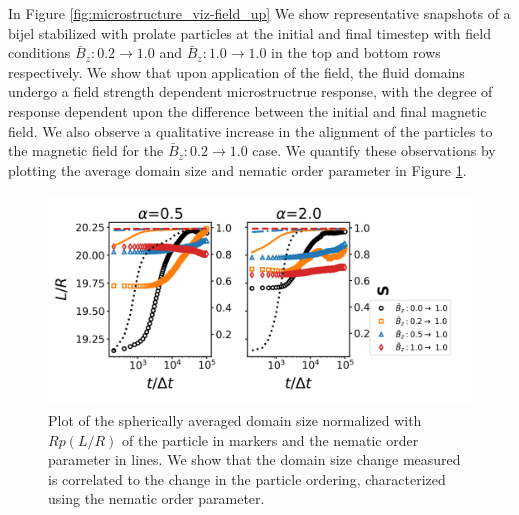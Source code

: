 In Figure \ref{fig:microstructure_viz-field_up} We show representative
snapshots of a bijel stabilized with prolate particles at the initial
and final timestep with field conditions
$\bar{B}_z: 0.2 \rightarrow 1.0$ and
$\bar{B}_z: 1.0 \rightarrow 1.0$ in the top and bottom rows
respectively. We show that upon application of the field, the fluid
domains undergo a field strength dependent microstructrue response, with
the degree of response dependent upon the difference between the initial
and final magnetic field. We also observe a qualitative increase in the
alignment of the particles to the magnetic field for the
$\bar{B}_z: 0.2 \rightarrow 1.0$ case. We quantify these observations
by plotting the average domain size and nematic order parameter in
Figure \ref{fig:domain_size-field_up}.

\begin{figure} 
\centering 
\includegraphics[scale=0.5]{../figures/results/paper2/domain_size-field_up.png} 
\caption{Plot of the spherically averaged domain size normalized with $Rp(L/R)$ of the particle in markers and the nematic order parameter in lines. 
         We show that the domain size change measured is correlated to the change in the particle ordering, characterized using the nematic order parameter.} 
\label{fig:domain_size-field_up} 
\end{figure}


